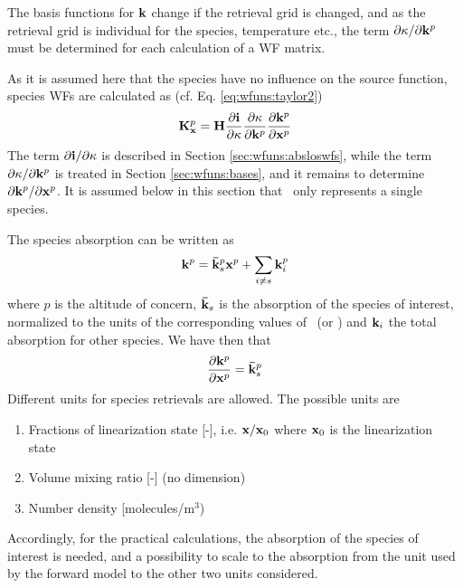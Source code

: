  The basis functions for $\mathbf{k}$ change if the retrieval grid is
 changed, and as the retrieval grid is individual for the species, 
 temperature etc., the term $\partial\kappa/ \partial \mathbf{k}^p$ 
 must be determined for each calculation of a WF matrix.


 \label{sec:wfuns:species}
 
 As it is assumed here that the species have no influence on
 the source function, species WFs are calculated as (cf. Eq.
 \ref{eq:wfuns:taylor2})
 \begin{equation}
    \mathbf{K}_{\mathbf{x}}^p = \mathbf{H}
                 \frac{\partial\mathbf{i}}{\partial \kappa}
                 \frac{\partial \kappa}{\partial \mathbf{k}^p}
                 \frac{\partial \mathbf{k}^p}{\partial \mathbf{x}^p}
  \label{eq:wfuns:species}
 \end{equation}
 The term $\partial\mathbf{i} / \partial \kappa$ is described in Section
 \ref{sec:wfuns:absloswfs}, while the term $\partial \kappa /\partial
 \mathbf{k}^p$ is treated in Section \ref{sec:wfuns:bases}, and it
 remains to determine $\partial \mathbf{k}^p / \partial \mathbf{x}^p$. It is
 assumed below in this section that \xt\ only represents a single 
 species.

 The species absorption can be written as
 \begin{equation}
   \mathbf{k}^p = \mathbf{\bar{k}}^p_s \mathbf{x}^p + \sum_{i\ne s} \mathbf{k}^p_i
  \label{eq:wfuns:kspecies}
 \end{equation}
 where $p$ is the altitude of concern, $\mathbf{\bar{k}}_s$ is the
 absorption of the species of interest, normalized to the units of the
 corresponding values of \xt\ (or \bt) and $\mathbf{k}_i$ the total
 absorption for other species.
 We have then that
 \begin{equation}
   \frac{\partial \mathbf{k}^p}{\partial \mathbf{x}^p} = \mathbf{\bar{k}}^p_s
  \label{eq:wfuns:dkspecies}
 \end{equation}
 Different units for species retrievals are allowed. The possible units are
 \begin{enumerate}
    \item Fractions of linearization state [-], i.e. $\mathbf{x}/\mathbf{x}_0$ where
          $\mathbf{x}_0$ is the linearization state 
    \item Volume mixing ratio [-] (no dimension)
    \item Number density [molecules/m$^3$)
 \end{enumerate}
 Accordingly, for the practical calculations, the absorption of the
 species of interest is needed, and a possibility to scale to the
 absorption from the unit used by the forward model to the other two
 units considered.
 
